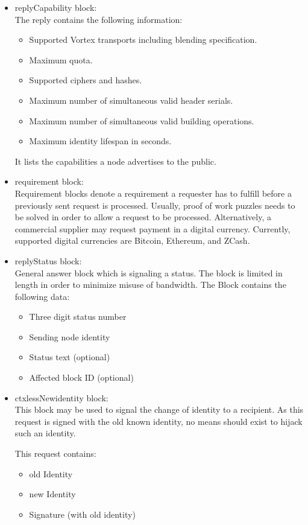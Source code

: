 \begin{itemize}
	\item replyCapability block:\\
	The reply contains the following information:
	\begin{itemize}
		\item Supported Vortex transports including blending specification.
		\item Maximum quota.
		\item Supported ciphers and hashes.
		\item Maximum number of simultaneous valid header serials.
		\item Maximum number of simultaneous valid building operations.
		\item Maximum identity lifespan in seconds.
	\end{itemize}
	It lists the capabilities a node advertises to the public. 
	
	\item requirement block:\\
	Requirement blocks denote a requirement a requester has to fulfill before a previously sent request is processed. Usually, proof of work puzzles needs to be solved in order to allow a request to be processed. Alternatively, a commercial supplier may request payment in a digital currency. Currently, supported digital currencies are Bitcoin, Ethereum, and ZCash.
	
	\item replyStatus block:\\
	General answer block which is signaling a status. The block is limited in length in order to minimize misuse of bandwidth. The Block contains the following data:
	\begin{itemize}
		\item Three digit status number
		\item Sending node identity
		\item Status text (optional)
		\item Affected block ID (optional)
	\end{itemize}
	
	\item ctxlessNewidentity block:\\
	This block may be used to signal the change of identity to a recipient. As this request is signed with the old known identity, no means should exist to hijack such an identity.
	
	This request contains:
	\begin{itemize}
		\item old Identity
		\item new Identity
		\item Signature (with old identity)
	\end{itemize}
	

\end{itemize}
